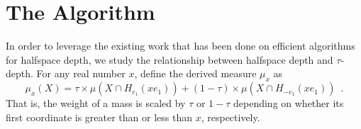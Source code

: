 \documentclass[lotsofwhite]{patmorin}
\newcommand{\taudepth}{$\tau$-depth}
\begin{document}
\section{The Algorithm}

In order to leverage the existing work that has been done on efficient
algorithms for halfspace depth, we study the relationship between
halfspace depth and \taudepth.  For any real number $x$, define the
derived measure $\mu_x$ as
\[
           \mu_x(X) = \tau\times \mu(X\cap H_{e_1}(xe_1)) 
               + (1-\tau)\times \mu(X\cap H_{-e_1}(xe_1)) \enspace .
\]
That is, the weight of a mass is scaled by $\tau$ or $1-\tau$
depending on whether its first coordinate is greater than or less than
$x$, respectively.
\end{document}
